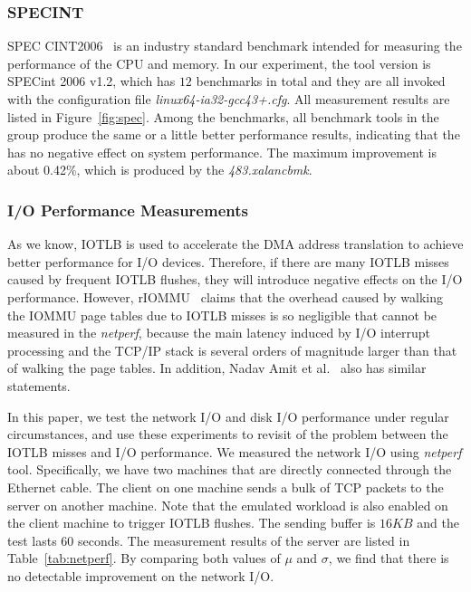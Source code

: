 \subsubsection{SPECINT}
SPEC CINT2006~\cite{specint} is an industry standard benchmark intended for measuring the performance of the CPU and memory.
In our experiment, the tool version is SPECint 2006 v1.2, which has $12$ benchmarks in total and they are all invoked with the configuration file \emph{linux64-ia32-gcc43+.cfg}.
All measurement results are listed in Figure~\ref{fig:spec}.
Among the benchmarks, all benchmark tools in the \name group produce the same or a little better performance results, indicating that the \name has no negative effect on system performance.
The maximum improvement is about 0.42\%, which is produced by the \emph{483.xalancbmk}.

\subsubsection{I/O Performance Measurements}
As we know, IOTLB is used to accelerate the DMA address translation to achieve better performance for I/O devices.
Therefore, if there are many IOTLB misses caused by frequent IOTLB flushes, they will introduce negative effects on the I/O performance.
However,  rIOMMU~\cite{malka2015riommu} claims that the overhead caused by walking the IOMMU page tables due to IOTLB misses is so negligible that cannot be measured in the \emph{netperf}, because the main latency induced by I/O interrupt processing and the TCP/IP stack is several orders of magnitude larger than that of walking the page tables.
In addition, Nadav Amit et al.~\cite{amit2012iommu} also has similar statements.

In this paper, we test the network I/O and disk I/O performance under regular circumstances, and use these experiments to revisit of the problem between the IOTLB misses and I/O performance.
We measured the network I/O using \emph{netperf} tool. Specifically, we have two machines that are directly connected through the Ethernet cable.
The client on one machine sends a bulk of TCP packets to the server on another machine. Note that the emulated workload is also enabled on the client machine to trigger IOTLB flushes.
The sending buffer is $16KB$ and the test lasts 60 seconds.
The measurement results of the server are listed in Table~\ref{tab:netperf}.
By comparing both values of $\mu$ and $\sigma$, we find that there is no detectable improvement on the network I/O.

